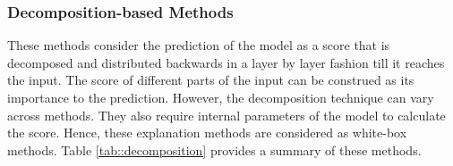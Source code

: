 





\subsubsection{Decomposition-based Methods}
\label{sec:white_decom}

These methods consider the prediction of the model as a score that is decomposed and distributed backwards in a layer by layer fashion till it reaches the input. The score of different parts of the input can be construed as its importance to the prediction. However, the decomposition technique can vary across methods. They also require internal parameters of the model to calculate the score. Hence, these explanation methods are considered as white-box methods. Table \ref{tab::decomposition} provides a summary of these methods. %


